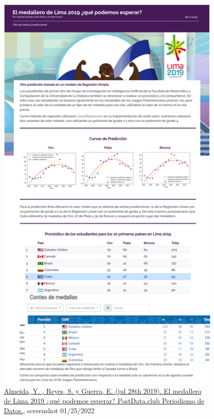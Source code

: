 \begin{figure}[h]
    \centering
    \includegraphics[height=0.8\textheight]{images/panamerican.png}
    \caption{\href{http://www.postdata.club/issues/201907/el-medallero-de-lima-2019-que-se-puede-esperar.html}{Almeida, Y. , Reyes, S. y Guerra, E. (jul 28th 2019). El medallero de Lima 2019 ¿qué podemos esperar? PostData.club Periodismo de Datos.}, screenshot 01/25/2022}
    \label{sec:panamerican}
\end{figure}

